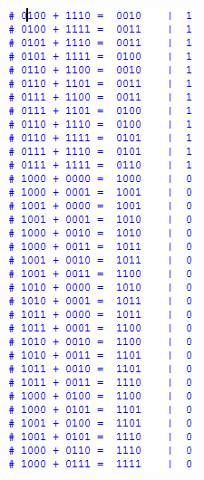 \begin{figure}[H]
\begin{subfigure}[b]{0.44\textwidth}
		\end{subfigure}

		\begin{subfigure}[b]{0.44\textwidth}
			\includegraphics[width=\textwidth]{img/etapa3/simulacaoSomadorCompleto4Bits_5}

\end{subfigure}
\end{figure}

